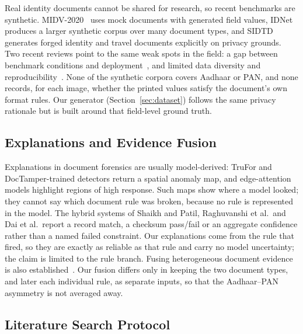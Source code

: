 \documentclass[12pt]{article}
\begin{document}
Real identity documents cannot be shared for research, so recent
benchmarks are synthetic. MIDV-2020~\cite{midv} uses mock documents with
generated field values, IDNet~\cite{idnet} produces a larger synthetic
corpus over many document types, and SIDTD~\cite{sidtd} generates
forged identity and travel documents explicitly on privacy grounds.
Two recent reviews point to the same weak spots in the field: a gap
between benchmark conditions and deployment~\cite{survey}, and limited
data diversity and reproducibility~\cite{zhang}. None of the synthetic
corpora covers Aadhaar or PAN, and none records, for each image,
whether the printed values satisfy the document's own format rules. Our
generator (Section~\ref{sec:dataset}) follows the same privacy
rationale but is built around that field-level ground truth.

\subsection{Explanations and Evidence Fusion}

Explanations in document forensics are usually model-derived: TruFor and
DocTamper-trained detectors return a spatial anomaly map, and
edge-attention models highlight regions of high response. Such maps
show where a model looked; they cannot say which document rule was
broken, because no rule is represented in the model. The hybrid systems
of Shaikh and Patil, Raghuvanshi et al.\ and Dai et al.\ report a
record match, a checksum pass/fail or an aggregate confidence rather
than a named failed constraint. Our explanations come from the rule that
fired, so they are exactly as reliable as that rule and carry no model
uncertainty; the claim is limited to the rule branch. Fusing
heterogeneous document evidence is also established~\cite{dai}. Our
fusion differs only in keeping the two document types, and later each
individual rule, as separate inputs, so that the Aadhaar--PAN asymmetry
is not averaged away.

\subsection{Literature Search Protocol}
\label{sec:search-protocol}
\end{document}

